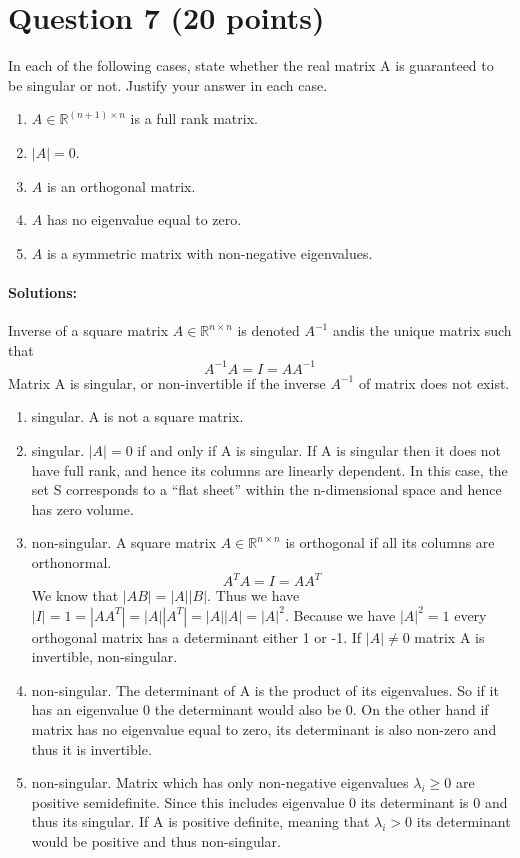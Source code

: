 \documentclass[
	10pt, %
]{../fphw}
\begin{document}
	\section*{Question 7 (20 points)}
	\begin{problem}
		In each of the following cases, state whether the real matrix A is guaranteed to be singular or not. Justify your answer in each
		case.
		\medskip
		\begin{enumerate}
			\item $A \in \mathbb{R}^{(n+1) \times n}$ is a full rank matrix.
			\item $|A| = 0$.
			\item $A$ is an orthogonal matrix.
			\item $A$ has no eigenvalue equal to zero.
			\item $A$ is a symmetric matrix with non-negative eigenvalues.
		\end{enumerate}
	\end{problem}

	\paragraph{Solutions:} Inverse of a square matrix $A \in \mathbb{R}^{n \times n}$ is denoted $A^{-1}$ andis the unique matrix such
	that
	\begin{equation*}
		A^{-1}A = I = AA^{-1}
	\end{equation*}
	Matrix A is singular, or non-invertible if the inverse $A^{-1}$ of matrix does not exist.
	
	\begin{enumerate}
		\item singular. A is not a square matrix.
		\item singular. $|A| = 0$ if and only if A is singular. If A is singular then it does not have full rank, and hence its columns are linearly dependent. In this case, the set S corresponds to a “flat sheet” within the n-dimensional space and hence has zero volume.
		\item non-singular. A square matrix $A \in \mathbb{R}^{n \times n}$ is orthogonal if all its columns are orthonormal.
		\begin{equation*}
			A^TA = I = AA^T
		\end{equation*}
		We know that $|AB| = |A||B|$. Thus we have $|I| = 1 = |AA^T| = |A||A^T| = |A||A| = |A|^2 $. Because we have $|A|^2 = 1$ every orthogonal matrix has a determinant either 1 or -1. If $|A| \ne 0$ matrix A is invertible, non-singular.
		\item non-singular. The determinant of A is the product of its eigenvalues. So if it has an eigenvalue 0 the determinant would also be 0. On the other hand if matrix has no eigenvalue equal to zero, its determinant is also non-zero and thus it is invertible.
		\item non-singular. Matrix which has only non-negative eigenvalues $\lambda_i \geq 0$ are positive semidefinite. Since this includes eigenvalue 0 its determinant is 0 and thus its singular. If A is positive definite, meaning that $\lambda_i > 0$ its determinant would be positive and thus non-singular.
	\end{enumerate}
	
\end{document}
